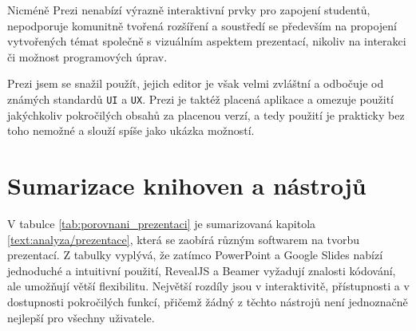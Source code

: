 Nicméně Prezi nenabízí výrazně interaktivní prvky pro zapojení studentů, nepodporuje komunitně tvořená rozšíření a soustředí se především na propojení vytvořených témat společně s vizuálním aspektem prezentací, nikoliv na interakci či možnost programových úprav.

Prezi jsem se snažil použít, jejich editor je však velmi zvláštní a odbočuje od známých standardů \texttt{UI} a \texttt{UX}.
Prezi je taktéž placená aplikace a omezuje použití jakýchkoliv pokročilých obsahů za placenou verzí, a tedy použití je prakticky bez toho nemožné a slouží spíše jako ukázka možností.

\section{Sumarizace knihoven a nástrojů}

V tabulce \ref{tab:porovnani_prezentaci} je sumarizovaná kapitola \ref{text:analyza/prezentace}, která se zaobírá různým softwarem na tvorbu prezentací.
Z tabulky vyplývá, že zatímco PowerPoint a Google Slides nabízí jednoduché a intuitivní použití, RevealJS a Beamer vyžadují znalosti kódování, ale umožňují větší flexibilitu. Největší rozdíly jsou v interaktivitě, přístupnosti a v dostupnosti pokročilých funkcí, přičemž žádný z těchto nástrojů není jednoznačně nejlepší pro všechny uživatele.


\begin{table}[h!]
    \centering
    \caption{Porovnání aplikací pro tvorbu prezentací}
    \label{tab:porovnani_prezentaci}
\end{table}


